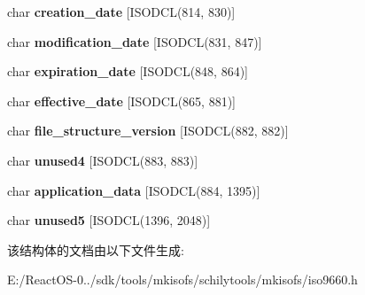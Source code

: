 \begin{DoxyCompactItemize}
char {\bfseries creation\+\_\+date} \mbox{[}I\+S\+O\+D\+CL(814, 830)\mbox{]}
\item 
\mbox{\label{structiso__enhanced__descriptor_afa1bdbec134c0edb563b9078c4de21b2}} 
char {\bfseries modification\+\_\+date} \mbox{[}I\+S\+O\+D\+CL(831, 847)\mbox{]}
\item 
\mbox{\label{structiso__enhanced__descriptor_a81bd6bdf35bda7b9c0c352f6d02d1577}} 
char {\bfseries expiration\+\_\+date} \mbox{[}I\+S\+O\+D\+CL(848, 864)\mbox{]}
\item 
\mbox{\label{structiso__enhanced__descriptor_a9bebd7433f97f54b061cfacde15191eb}} 
char {\bfseries effective\+\_\+date} \mbox{[}I\+S\+O\+D\+CL(865, 881)\mbox{]}
\item 
\mbox{\label{structiso__enhanced__descriptor_ad06770e3fdc241c1e4c5d08f5295595e}} 
char {\bfseries file\+\_\+structure\+\_\+version} \mbox{[}I\+S\+O\+D\+CL(882, 882)\mbox{]}
\item 
\mbox{\label{structiso__enhanced__descriptor_a105efe87d38fad6505333530802aa312}} 
char {\bfseries unused4} \mbox{[}I\+S\+O\+D\+CL(883, 883)\mbox{]}
\item 
\mbox{\label{structiso__enhanced__descriptor_a3b62c3988bed44cf607eeca5f016759c}} 
char {\bfseries application\+\_\+data} \mbox{[}I\+S\+O\+D\+CL(884, 1395)\mbox{]}
\item 
\mbox{\label{structiso__enhanced__descriptor_a1b67326e83b24c85d60f03835411f988}} 
char {\bfseries unused5} \mbox{[}I\+S\+O\+D\+CL(1396, 2048)\mbox{]}
\end{DoxyCompactItemize}


该结构体的文档由以下文件生成\+:\begin{DoxyCompactItemize}
\item 
E\+:/\+React\+O\+S-\/0../sdk/tools/mkisofs/schilytools/mkisofs/iso9660.\+h\end{DoxyCompactItemize}
